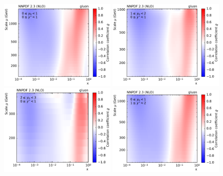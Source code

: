 \begin{figure}[htbp]
    \centering
    \includegraphics[width=0.49\textwidth]{figures/pdf_constraints/corr_PTMAXEXPYS_YBYS_NLO_FINALBINS_NNPDF23_gluon_ys0_0yb0_0_cl.pdf}\hfill
    \includegraphics[width=0.49\textwidth]{figures/pdf_constraints/corr_PTMAXEXPYS_YBYS_NLO_FINALBINS_NNPDF23_gluon_ys0_0yb1_0_cl.pdf}\hfill
    \includegraphics[width=0.49\textwidth]{figures/pdf_constraints/corr_PTMAXEXPYS_YBYS_NLO_FINALBINS_NNPDF23_gluon_ys0_0yb2_0_cl.pdf}\hfill
    \includegraphics[width=0.49\textwidth]{figures/pdf_constraints/corr_PTMAXEXPYS_YBYS_NLO_FINALBINS_NNPDF23_gluon_ys1_0yb0_0_cl.pdf}\hfill

\end{figure}
